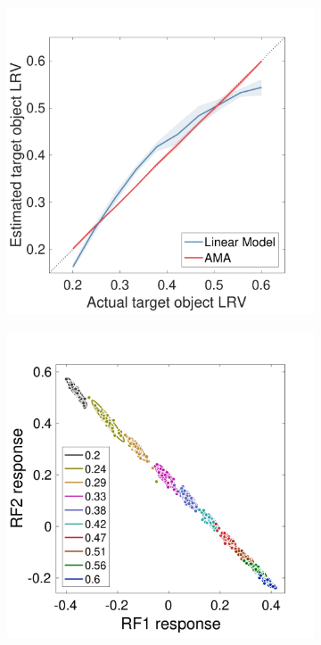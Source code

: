 \documentclass{jov}
\begin{document}
\begin{figure}
\begin{subfigure}[b]{0.22 \textwidth}
        \label{fig:case2RFResponseIsomer}
    \end{subfigure}
            \begin{subfigure}[b]{0.22 \textwidth}
        \caption{  \newline {}}
        \includegraphics[width=\textwidth, trim={0 0 0 1.5cm},clip]{../FiguresDraft4/Figure11/Figure11_c.pdf}
        \label{fig:case2ContrastEstimates}
    \end{subfigure}
            \begin{subfigure}[b]{0.22 \textwidth}
        \caption{  \newline {}}
        \includegraphics[width=\textwidth, trim={0 0 0 1.5cm},clip]{../FiguresDraft4/Figure11/Figure11_d.pdf}

\end{subfigure}
\end{figure}
\end{document}
